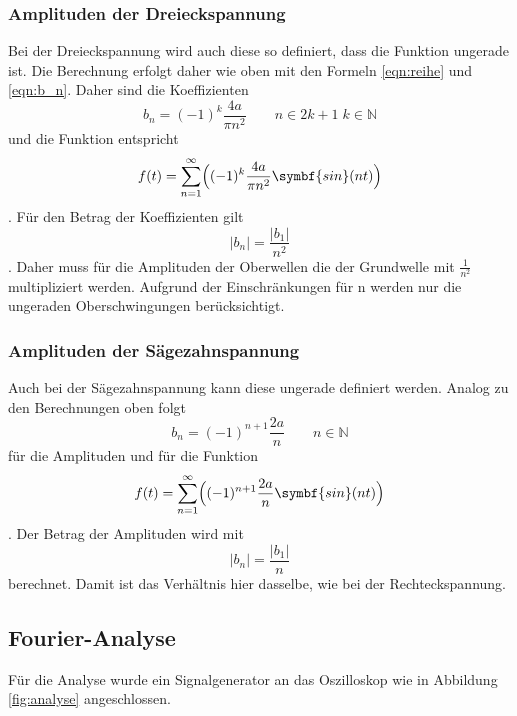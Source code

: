 \subsubsection{Amplituden der Dreieckspannung}
Bei der Dreieckspannung wird auch diese so definiert, dass die Funktion ungerade ist.
Die Berechnung erfolgt daher wie oben mit den Formeln \ref{eqn:reihe} und \ref{eqn:b_n}.
Daher sind die Koeffizienten
\begin{equation}
    b_n=(-1)^k\frac{4a}{\pi n^2} \qquad n\in2k+1 \; k\in\mathbb{N}
    \label{eqn:amp_drei}
\end{equation}   
und die Funktion entspricht
\begin{equation}
    f(t)=\sum_{n=1}^{\infty}\Bigl((-1)^k \frac{4a}{ \pi n^2} \symbf{sin}(n t)\Bigr) 
    \label{eqn:drei}
\end{equation}.
Für den Betrag der Koeffizienten gilt
\begin{equation}
    |b_n|=\frac{|b_1|}{n^2}
    \label{eqn:b_drei}
\end{equation}.
Daher muss für die Amplituden der Oberwellen die der Grundwelle mit $\frac{1}{n^2}$ multipliziert werden. 
Aufgrund der Einschränkungen für n werden nur die ungeraden Oberschwingungen berücksichtigt.

\subsubsection{Amplituden der Sägezahnspannung}
Auch bei der Sägezahnspannung kann diese ungerade definiert werden.
Analog zu den Berechnungen oben folgt
\begin{equation}
    b_n=(-1)^{n+1}\frac{2a}{ n} \qquad n\in\mathbb{N}
    \label{eqn:amp_säge}
\end{equation} 
für die Amplituden und für die Funktion
\begin{equation}
    f(t)=\sum_{n=1}^{\infty}\Bigl( (-1)^{n+1}\frac{2a}{ n} \symbf{sin}(n t)\Bigr) 
    \label{eqn:drei}
\end{equation}.
Der Betrag der Amplituden wird mit
\begin{equation}
    |b_n|=\frac{|b_1|}{n} 
    \label{eqn:b_säge}
\end{equation}
berechnet. Damit ist das Verhältnis hier dasselbe, wie bei der Rechteckspannung.

\subsection{Fourier-Analyse}
Für die Analyse wurde ein Signalgenerator an das Oszilloskop wie in Abbildung \ref{fig:analyse} angeschlossen.

